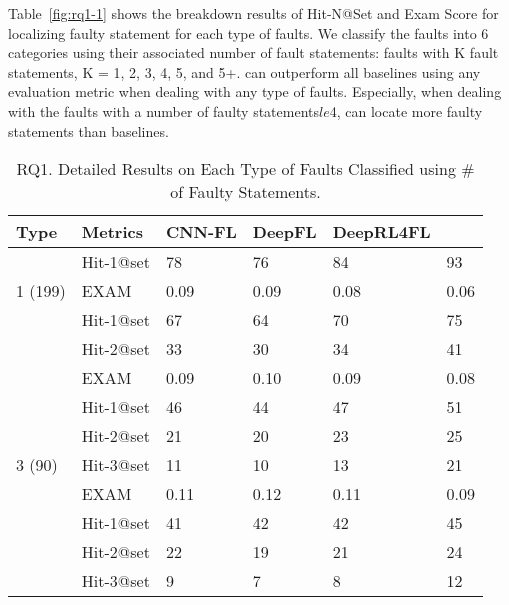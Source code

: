 Table~\ref{fig:rq1-1} shows the breakdown results of Hit-N@Set and Exam Score for localizing faulty statement for each type of faults. We classify the faults into 6 categories using their associated number of fault statements: faults with K fault statements, K = 1, 2, 3, 4, 5, and 5+. {\tool} can outperform all baselines using any evaluation metric when dealing with any type of faults. Especially, when dealing with the faults with a number of faulty statements$le$4, {\tool} can locate more faulty statements than baselines.

\begin{table}[t]
	\caption{RQ1. Detailed Results on Each Type of Faults Classified using \# of Faulty Statements.}
	{\small
		\begin{center}
			\renewcommand{\arraystretch}{1}
			\begin{tabular}{p{0.8cm}<{\centering}|p{1.33cm}<{\centering}|p{1cm}<{\centering}|p{0.7cm}<{\centering}|p{1cm}<{\centering}|p{1cm}<{\centering}}
				\hline
				Type& Metrics & CNN-FL & DeepFL & DeepRL4FL & \tool \\
				\hline
				\multirow{3}{*}{1 (199)}   & Hit-1@set     & 78 & 76 & 84 & 93 \\
							    		 & EXAM          & 0.09 & 0.09 & 0.08 & 0.06 \\
				\hline
				\multirow{4}{*}{2 (142)}  & Hit-1@set     & 67 & 64 & 70 & 75 \\
										& Hit-2@set     & 33 & 30 & 34 & 41 \\
									   	& EXAM          & 0.09 & 0.10 & 0.09 & 0.08 \\
				\hline
				\multirow{5}{*}{3 (90)}  & Hit-1@set     & 46 & 44 & 47 & 51 \\
										& Hit-2@set     & 21 & 20 & 23 & 25\\
										& Hit-3@set     & 11 &10 & 13 & 21 \\
										& EXAM          & 0.11 & 0.12 & 0.11 & 0.09 \\
				\hline
				\multirow{6}{*}{4 (78)}  & Hit-1@set     & 41 & 42 & 42 & 45 \\
										& Hit-2@set     &22 & 19 & 21 & 24 \\
										& Hit-3@set     & 9 & 7 & 8 & 12 \\

\end{tabular}
\end{center}}
\end{table}
